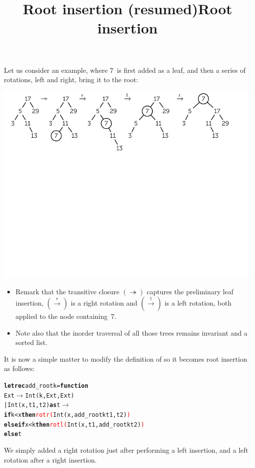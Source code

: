 \documentclass[wide]{slides}
\begin{document}
\begin{slide}
  \title{Root insertion (resumed)}

  Let us consider an example, where \(7\)~is first added as a leaf,
  and then a series of rotations, left and right, bring it to the
  root:
  \begin{center}
    \includegraphics[trim=5mm 62mm 15mm 0]{insr_ex.pdf}
  \end{center}
  \begin{itemize}

    \item Remark that the transitive closure
      \;\((\twoheadrightarrow)\) captures the preliminary leaf
      insertion, \((\xrightarrow{\textsf{r}})\) is a right rotation
      and \((\xrightarrow{\textsf{l}})\) is a left rotation, both
      applied to the node containing~\(7\).

    \item Note also that the inorder traversal of all those trees
      remains invariant and a sorted list.

  \end{itemize}

\end{slide}

\begin{slide}
  \title{Root insertion}

  It is now a simple matter to modify the definition of
   so it becomes root insertion  as follows:
\begin{alltt}
\textbf{let rec} add_root k = \textbf{function}
  Ext \(\rightarrow\) Int (k, Ext, Ext)
| Int (x,t1,t2) \textbf{as} t \(\rightarrow\)
    \textbf{if} k < x \textbf{then} \textcolor{red}{rotr (}Int (x, add_root k t1, t2)\textcolor{red}{)}
    \textbf{else if} x < k \textbf{then} \textcolor{red}{rotl (}Int (x, t1, add_root k t2)\textcolor{red}{)}
                    \textbf{else} t
\end{alltt}

We simply added a right rotation just after performing a left
insertion, and a left rotation after a right insertion.
\end{slide}
\end{document}
